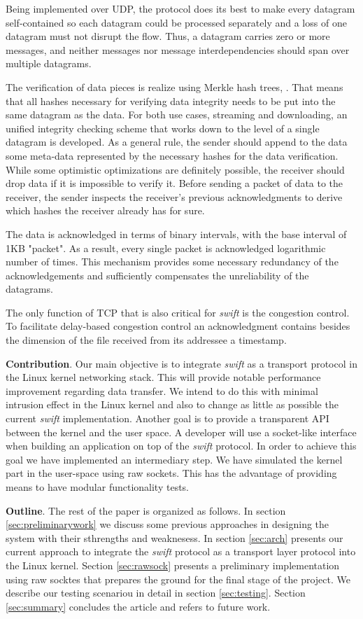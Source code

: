 Being implemented over UDP, the protocol does its best to make every datagram self-contained so each datagram could be 
processed separately and a loss of one datagram must not disrupt the flow. Thus, a datagram carries zero or more
messages, and neither messages nor message interdependencies should span over multiple datagrams. 

The verification of data pieces is realize using Merkle hash trees\cite{merkle}, \cite{merkle-ext}. That means that all
hashes necessary for verifying data integrity needs to be put into the same datagram as the data. For both use cases,
streaming and downloading, an unified  integrity checking scheme that works down to the level of a single datagram is
developed. As a general rule, the sender should append to the data some meta-data represented by the necessary hashes
for the data verification. While some optimistic optimizations are definitely possible, the receiver should drop data if
it is impossible to verify it. Before sending a packet of data to the receiver, the sender inspects the receiver's
previous acknowledgments to derive which hashes the receiver already has for sure. 

The data is acknowledged in terms of binary intervals, with the base interval of 1KB "packet". As a result, every 
single packet is acknowledged logarithmic number of times. This mechanism provides some necessary redundancy of the
acknowledgements and sufficiently compensates the unreliability of the datagrams. 

The only function of TCP that is also critical for \emph{swift} is the congestion control. To facilitate delay-based 
congestion control an acknowledgment contains besides the dimension of the file received from its addressee a timestamp.


\textbf{Contribution}. Our main objective is to integrate \emph{swift} as a transport protocol in the Linux kernel 
networking stack. This will provide notable performance improvement regarding data transfer. We intend to do this with 
minimal intrusion effect in the Linux kernel and also to change as little as possible the current \emph{swift} 
implementation. Another goal is to provide a transparent API between the kernel and the user space. A developer will use 
a socket-like interface when building an application on top of the \emph{swift} protocol. In order to achieve this goal
we have implemented an intermediary step. We have simulated the kernel part in the user-space using raw sockets. This 
has the advantage of providing means to have modular functionality tests.


\textbf{Outline}. The rest of the paper is organized as follows. In section \ref{sec:preliminarywork} we discuss some
previous approaches in designing the system with their sthrengths and weaknesess. In section \ref{sec:arch}
 presents our current approach to integrate the \emph{swift} protocol as a transport layer protocol into the Linux
kernel. Section \ref{sec:rawsock} presents a preliminary implementation using raw socktes that prepares the ground for
the final stage of the project.  We describe our testing scenariou in detail in section \ref{sec:testing}. Section
\ref{sec:summary} concludes the article and refers to future work.

